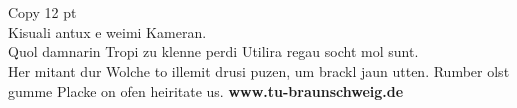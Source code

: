 \documentclass[a3paper,13pt]{tubsposter}
\begin{document}
\begin{tubsposter}[sender=bottom]
  \showtubslogo[right]
  \begin{posterrow}[bgimage=infozentrum.jpg,imagefit=cropped]{1}
    ~
  \end{posterrow}
  \begin{posterrow}[bgimage=titlepicture.jpg]{1}
    ~
  \end{posterrow}
  \begin{posterrow}[bgimage=titlepicture.jpg]{1}
    ~
  \end{posterrow}
  \begin{posterrow}[bgimage=titlepicture.jpg]{1}
    ~
  \end{posterrow}
  \begin{posterrow}[bgimage=titlepicture.jpg]{1}
    ~
  \end{posterrow}
  \begin{posterrow}[bgimage=titlepicture.jpg]{1}
    ~
  \end{posterrow}
  \begin{posterrow}[bgimage=titlepicture.jpg]{1}
    ~
  \end{posterrow}
  \begin{posterrow}[bgcolor=tuBlueDark20]{1}
    Copy 12 pt\\
    Kisuali antux e weimi Kameran.\\
    Quol damnarin Tropi zu klenne perdi Utilira regau socht mol sunt.\\
    Her mitant dur Wolche to illemit drusi puzen, um brackl jaun utten. Rumber olst gumme Placke on ofen heiritate us.
    \vfill
    \textbf{www.tu-braunschweig.de}
  \end{posterrow}
\end{tubsposter}
\end{document}
